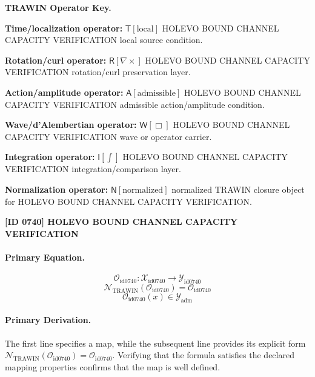 \par\vspace{0.45\baselineskip}
\noindent\begin{minipage}[t]{\linewidth}
\begingroup
\small
\raggedright
\textbf{TRAWIN Operator Key.}\par
\noindent\textbf{Time/localization operator:} $\mathsf{T}\!\left[\mathrm{local}\right]$ HOLEVO BOUND CHANNEL CAPACITY VERIFICATION local source condition.\par
\noindent\textbf{Rotation/curl operator:} $\mathsf{R}\!\left[\nabla\times\right]$ HOLEVO BOUND CHANNEL CAPACITY VERIFICATION rotation/curl preservation layer.\par
\noindent\textbf{Action/amplitude operator:} $\mathsf{A}\!\left[\mathrm{admissible}\right]$ HOLEVO BOUND CHANNEL CAPACITY VERIFICATION admissible action/amplitude condition.\par
\noindent\textbf{Wave/d'Alembertian operator:} $\mathsf{W}\!\left[\Box\right]$ HOLEVO BOUND CHANNEL CAPACITY VERIFICATION wave or operator carrier.\par
\noindent\textbf{Integration operator:} $\mathsf{I}\!\left[\int\right]$ HOLEVO BOUND CHANNEL CAPACITY VERIFICATION integration/comparison layer.\par
\noindent\textbf{Normalization operator:} $\mathsf{N}\!\left[\mathrm{normalized}\right]$ normalized TRAWIN closure object for HOLEVO BOUND CHANNEL CAPACITY VERIFICATION.\par
\endgroup
\end{minipage}

\clearpage
\noindent\textbf{[ID 0740] HOLEVO BOUND CHANNEL CAPACITY VERIFICATION}\par
\vspace{0.35em}
\paragraph{Primary Equation.}
\[
\mathcal{O}_{\mathrm{id0740}}:\mathcal{X}_{\mathrm{id0740}}\longrightarrow\mathcal{Y}_{\mathrm{id0740}}
\]
\[
\mathcal{N}_{\mathrm{TRAWIN}}(\mathcal{O}_{\mathrm{id0740}})=\mathcal{O}_{\mathrm{id0740}}
\]
\[
\mathcal{O}_{\mathrm{id0740}}(x)\in\mathcal{Y}_{\mathrm{adm}}
\]

\paragraph{Primary Derivation.}
The first line specifies a map, while the subsequent line provides its explicit form \( \mathcal{N}_{\mathrm{TRAWIN}}(\mathcal{O}_{\mathrm{id0740}})=\mathcal{O}_{\mathrm{id0740}} \). Verifying that the formula satisfies the declared mapping properties confirms that the map is well defined.
